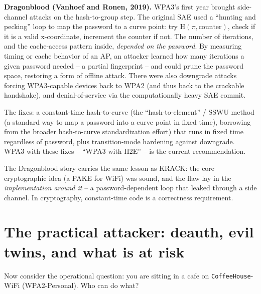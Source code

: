 \begin{attackbox}
\textbf{Dragonblood (Vanhoef and Ronen, 2019).} WPA3's first year brought side-
channel attacks on the hash-to-group step. The original SAE used a ``hunting and
pecking'' loop to map the password to a curve point: try $\mathrm{H}(\pi,
\text{counter})$, check if it is a valid x-coordinate, increment the counter if
not. The number of iterations, and the cache-access pattern inside, \emph{depended
on the password}. By measuring timing or cache behavior of an AP, an attacker
learned how many iterations a given password needed -- a partial fingerprint --
and could prune the password space, restoring a form of offline attack. There were
also downgrade attacks forcing WPA3-capable devices back to WPA2 (and thus back to
the crackable handshake), and denial-of-service via the computationally heavy SAE
commit.

The fixes: a constant-time hash-to-curve (the ``hash-to-element'' / SSWU method (a standard way to map a password into a curve point in fixed time),
borrowing from the broader hash-to-curve standardization effort) that runs in
fixed time regardless of password, plus transition-mode hardening against
downgrade. WPA3 with these fixes -- ``WPA3 with H2E'' -- is the current
recommendation.
\end{attackbox}

The Dragonblood story carries the same lesson as KRACK: the core cryptographic idea
(a PAKE for WiFi) was sound, and the flaw lay in the \emph{implementation around
it} -- a password-dependent loop that leaked through a side channel. In
cryptography, constant-time code is a correctness requirement.

\section{The practical attacker: deauth, evil twins, and what is at risk}

Now consider the operational question: you are sitting in a
cafe on \texttt{CoffeeHouse}-WiFi (WPA2-Personal). Who can do what?


